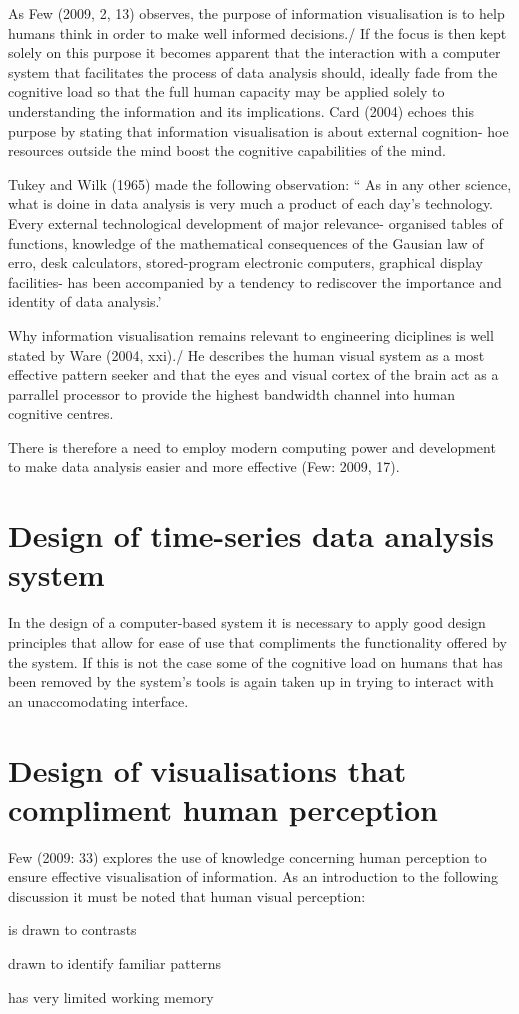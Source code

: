 \documentclass[12pt, a4paper]{report}
\begin{document}
 As Few (2009, 2, 13) observes, the purpose of information visualisation is to help humans think in order to make well informed decisions./
 If the focus is then kept solely on this purpose it becomes apparent that the interaction with a computer system
 that facilitates the process of data analysis should,
 ideally fade from the cognitive load so that the full human capacity may be applied solely to understanding the information
 and its implications.
 Card (2004) echoes this purpose by stating that information visualisation is about external cognition- hoe resources outside the mind
 boost the cognitive capabilities of the mind.
 
 Tukey and Wilk (1965) made the following observation:
 `` As in any other science, what is doine in data analysis is very much a product of each day's technology.
 Every external technological development of major relevance- organised tables of functions, knowledge of the mathematical consequences of
 the Gausian law of erro, desk calculators, stored-program electronic computers, graphical display facilities-
 has been accompanied by a tendency to rediscover the importance and identity of data analysis.'

 Why information visualisation remains relevant to engineering diciplines is well stated by Ware (2004, xxi)./
 He describes the human visual system as a most effective pattern seeker and that the eyes and visual cortex of the
 brain act as a parrallel processor to provide the highest bandwidth channel into human cognitive centres.

 There is therefore a need to employ modern computing power and development to make data analysis easier and more
 effective (Few: 2009, 17).

 \section{Design of time-series data analysis system}
 In the design of a computer-based system it is necessary to apply good design principles that allow for ease of use that compliments the
 functionality offered by the system. If this is not the case some of the cognitive load on humans that has been removed by the system's tools
 is again taken up in trying to interact with an unaccomodating interface.

 \section{Design of visualisations that compliment human perception}
 Few (2009: 33) explores the use of knowledge concerning human perception to ensure effective visualisation of information.
 As an introduction to the following discussion it must be noted that human visual perception:
   \item{is drawn to contrasts}
   \item{drawn to identify familiar patterns}
   \item{has very limited working memory}
     
\end{document}

